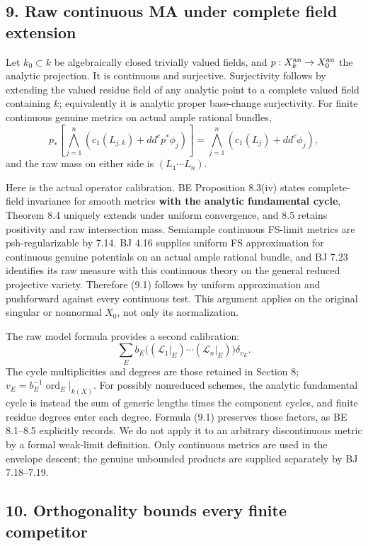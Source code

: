 \documentclass[
  10pt,
]{article}
\begin{document}
\subsection{9. Raw continuous MA under complete field
extension}\label{raw-continuous-ma-under-complete-field-extension}

Let \(k_0\subset k\) be algebraically closed trivially valued fields,
and \(p:X_k^{\rm an}\to X_0^{\rm an}\) the analytic projection. It is
continuous and surjective. Surjectivity follows by extending the valued
residue field of any analytic point to a complete valued field
containing \(k\); equivalently it is analytic proper base-change
surjectivity. For finite continuous genuine metrics on actual ample
rational bundles, \[p_*\left[\bigwedge_{j=1}^n
 (c_1(L_{j,k})+dd^cp^*\phi_j)\right]
=\bigwedge_{j=1}^n(c_1(L_j)+dd^c\phi_j),                               \tag{9.1}\]
and the raw mass on either side is \((L_1\cdots L_n)\).

Here is the actual operator calibration. BE Proposition 8.3(iv) states
complete-field invariance for smooth metrics \textbf{with the analytic
fundamental cycle}, Theorem 8.4 uniquely extends under uniform
convergence, and 8.5 retains positivity and raw intersection mass.
Semiample continuous FS-limit metrics are psh-regularizable by 7.14. BJ
4.16 supplies uniform FS approximation for continuous genuine potentials
on an actual ample rational bundle, and BJ 7.23 identifies its raw
measure with this continuous theory on the general reduced projective
variety. Therefore (9.1) follows by uniform approximation and
pushforward against every continuous test. This argument applies on the
original singular or nonnormal \(X_0\), not only its normalization.

The raw model formula provides a second calibration:
\[\sum_E b_E\big((\mathcal L_1|_E)\cdots(\mathcal L_n|_E)\big)\delta_{v_E}.
\] The cycle multiplicities and degrees are those retained in Section 8;
\(v_E=b_E^{-1}\operatorname{ord}_E|_{k(X)}\). For possibly nonreduced
schemes, the analytic fundamental cycle is instead the sum of generic
lengths times the component cycles, and finite residue degrees enter
each degree. Formula (9.1) preserves those factors, as BE 8.1--8.5
explicitly records. We do not apply it to an arbitrary discontinuous
metric by a formal weak-limit definition. Only continuous metrics are
used in the envelope descent; the genuine unbounded products are
supplied separately by BJ 7.18--7.19.

\subsection{10. Orthogonality bounds every finite
competitor}\label{orthogonality-bounds-every-finite-competitor}
\end{document}

